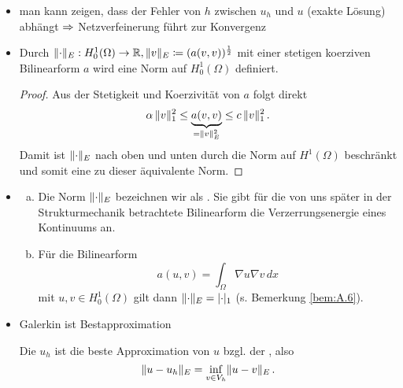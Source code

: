 \begin{itemize}
\item man kann zeigen, dass der Fehler von $h$ zwischen $u_h$ und $u$ (exakte Lösung) abhängt $\Rightarrow$ Netzverfeinerung führt zur Konvergenz

\item \begin{lemma}
Durch $\lVert \cdot\rVert _E: H^1_0(\Omega) \rightarrow \mathbb{R}, \lVert v\rVert_E \coloneqq (a(v,v))^{\frac 1 2}$ mit einer stetigen koerziven Bilinearform $a$ wird eine Norm auf $H_0^1(\Omega)$ definiert.
\end{lemma}

\begin{proof}
Aus der Stetigkeit und Koerzivität von $a$ folgt direkt
\begin{align}\label{eq:2.12}
	\alpha \, \lVert v\rVert_1^2 \le \underbrace{a(v,v)}_{= \lVert v\rVert_E^2} \le c \, \lVert v\rVert_1^2 \, .
\end{align}
Damit ist $\lVert \cdot\rVert_E$ nach oben und unten durch die Norm auf $H^1(\Omega)$ beschränkt und somit eine zu dieser äquivalente Norm.
\end{proof}

\item \begin{bem*}
\begin{enumerate}[(a)]
\item Die Norm $\lVert \cdot\rVert_E$ bezeichnen wir als \textit{}. Sie gibt für die von uns später in der Strukturmechanik betrachtete Bilinearform  die Verzerrungsenergie eines Kontinuums an.
\item Für die Bilinearform
\[
	a(u,v) = \int_\Omega \nabla u \nabla v \, dx
\]
mit $u,v \in H^1_0(\Omega)$ gilt dann $\lVert \cdot\rVert_E = \lvert \cdot\rvert_1$ (s. Bemerkung \ref{bem:A.6}).
\end{enumerate}
\end{bem*}

\item Galerkin ist Bestapproximation
\begin{satz}\label{satz:2.26}
Die  $u_h$ ist die beste Approximation von $u$ bzgl. der , also
\[
	\lVert u-u_h\rVert_E = \inf_{v \in V_h} \lVert u-v\rVert_E \, .
\]
\end{satz}


\end{itemize}
